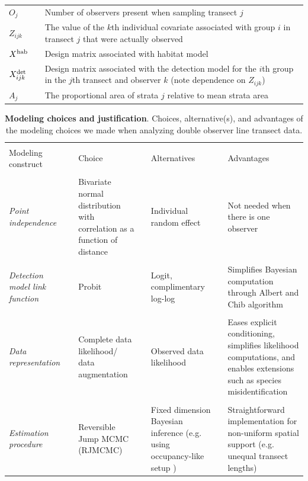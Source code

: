 \documentclass[10pt]{article}
\begin{document}
\begin{table}
\begin{tabular}{p{1.5cm}l p{12.5cm}}
$O_j$   & & Number of observers present when sampling transect $j$ \\
$Z_{ijk}$   & &  The value of the $k$th individual covariate associated with group
                $i$ in transect $j$ that were actually observed\\
$X^{\rm hab}$   & &  Design matrix associated with habitat model\\
$X^{\rm det}_{ijk}$   & &  Design matrix associated with the detection model for the $i$th group in the $j$th transect and observer $k$ (note dependence on $Z_{ijk}$) \\
$A_j$   & & The proportional area of strata $j$ relative to mean strata area\\
\hline
\end{tabular}
\begin{flushleft}
\end{flushleft}
\label{tab:defs}
\end{table}

\begin{table}
\caption{{\bf Modeling choices and justification}. Choices, alternative(s), and advantages of the
modeling choices we made when analyzing double observer line transect data.}
\begin{tabular}{p{3cm}l p{3cm}l p{3cm}l p{4cm}}
\hline \hline \\
Modeling construct & & Choice & & Alternatives & & Advantages \\
\hline
& & & & & & \\
{\it Point independence} & & Bivariate normal distribution with correlation as a function of distance
& & Individual random effect & & Not needed when there is one observer \\
& & & & & & \\
{\it Detection model link function} & & Probit & & Logit, complimentary log-log & & Simplifies Bayesian computation through
Albert and Chib algorithm \cite{AlbertChib1993} \\
& & & & & & \\
{\it Data representation} & & Complete data likelihood/ data augmentation & & Observed data likelihood
& & Eases explicit conditioning, simplifies likelihood computations, and enables extensions such as species misidentification\\
& & & & & & \\
{\it Estimation procedure} & & Reversible Jump MCMC (RJMCMC) & & Fixed dimension Bayesian inference (e.g. using occupancy-like setup \cite{RoyleEtAl2007})  & & Straightforward implementation for non-uniform spatial support (e.g. unequal transect lengths)\\
\hline
\end{tabular}
\label{tab:choices}
\end{table}


\end{document}
